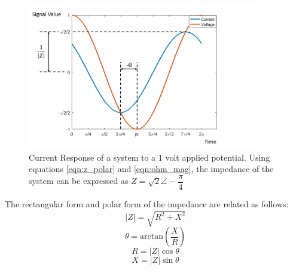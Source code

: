  \begin{figure}[ht]
    \centering
    \includegraphics[width=0.9\textwidth]{images/ac_signal.png}
    \caption[Current Response of a system to an applied voltage]{Current Response of a system to a 1 volt applied potential. Using equations \ref{eqn:z_polar} and \ref{eqn:ohm_mag}, the impedance of the system can be expressed as $Z=\sqrt{2}\angle -\dfrac{\pi}{4}$} 
    \label{fig:ac_signal}
 \end{figure}
 
 \par The rectangular form and polar form of the impedance are related as follows:
 \begin{equation}
     |Z| = \sqrt{R^2 + X^2}
 \end{equation}
 \begin{equation}
    \theta = \text{arctan}(\frac{X}{R})
 \end{equation}
 \begin{equation}
    R = |Z|\cos\theta
 \end{equation}
 \begin{equation}
     X = |Z|\sin\theta
 \end{equation}
 
